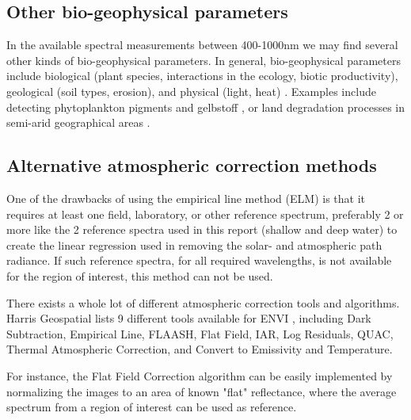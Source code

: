 
\subsection{Other bio-geophysical parameters}

In the available spectral measurements between 400-1000nm we may find several 
other kinds of bio-geophysical parameters. In general, bio-geophysical parameters 
include biological (plant species, interactions in the ecology, biotic 
productivity), geological (soil types, erosion), and physical (light, heat) \cite{website:esa_bio-geophysical}. 
Examples include detecting phytoplankton pigments and gelbstoff \cite{Lee:02}, or land degradation 
processes in semi-arid geographical areas \cite{Kaufmann2002}.

\subsection{Alternative atmospheric correction methods}

One of the drawbacks of using the empirical line method (ELM) is that it requires at 
least one field, laboratory, or other reference spectrum, preferably 2 or more like 
the 2 reference spectra used in this report (shallow and deep water) to create the 
linear regression used in removing the solar- and atmospheric path radiance. If such 
reference spectra, for all required wavelengths, is not available for the region of 
interest, this method can not be used. \cite{Karpouzli2003} 

There exists a whole lot of different atmospheric correction tools and algorithms. 
Harris Geospatial lists 9 different tools available for ENVI \cite{website:harrisgeo}, 
including Dark Subtraction, Empirical Line, FLAASH, Flat Field, IAR, Log Residuals, 
QUAC, Thermal Atmospheric Correction, and Convert to Emissivity and Temperature. 

For instance, the Flat Field Correction algorithm can be easily implemented 
by normalizing the images to an area of known "flat" reflectance, where 
the average spectrum from a region of interest can be used as reference.
